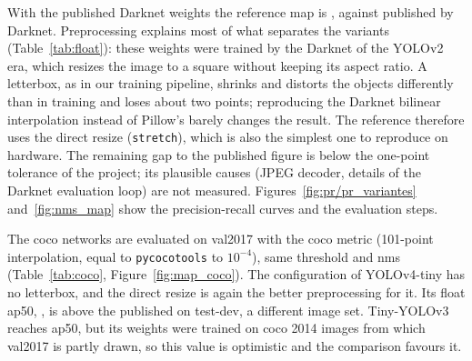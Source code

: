 \documentclass[11pt,a4paper]{article}
\begin{document}
With the published Darknet weights the reference \gls{map} is , against
 published by Darknet. Preprocessing explains most of what
separates the variants (Table~\ref{tab:float}): these weights were trained by the Darknet
of the YOLOv2 era, which resizes the image to a square without keeping its aspect ratio.
A \gls{letterbox}, as in our training pipeline, shrinks and distorts the objects differently
than in training and loses about two points; reproducing the Darknet bilinear
interpolation instead of Pillow's barely changes the result. The reference therefore uses
the direct resize (\texttt{stretch}), which is also the simplest one to reproduce on
hardware. The remaining gap to the published figure is below the one-point tolerance of
the project; its plausible causes (JPEG decoder, details of the Darknet evaluation loop)
are not measured. Figures~\ref{fig:pr/pr_variantes} and~\ref{fig:nms_map} show the
precision-recall curves and the evaluation steps.

\begin{table}[htbp]
\caption{Float \gls{map} on \gls{voc}2007 test by preprocessing ().}
\label{tab:float}
\small{}
\end{table}


The \gls{coco} networks are evaluated on val2017 with the \gls{coco} metric (101-point interpolation,
equal to \texttt{pycocotools} to $10^{-4}$), same threshold and \gls{nms}
(Table~\ref{tab:coco}, Figure~\ref{fig:map_coco}). The configuration of YOLOv4-tiny has no
\gls{letterbox}, and the direct resize is again the better preprocessing for it. Its float \gls{ap}50,
, is above the  published on
test-dev, a different image set. Tiny-YOLOv3 reaches  \gls{ap}50, but its
weights were trained on \gls{coco} 2014 images from which val2017 is partly drawn, so this value is
optimistic and the comparison favours it.

\begin{table}[htbp]
\caption{Float \gls{ap} on \gls{coco} val2017 ().}
\label{tab:coco}
\small{}
\end{table}


\end{document}
